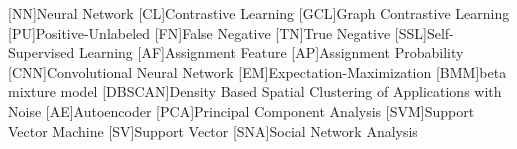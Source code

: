 \begin{acronym}

    [NN]{Neural Network}
    [CL]{Contrastive Learning}
    [GCL]{Graph Contrastive Learning}
    [PU]{Positive-Unlabeled}
    [FN]{False Negative}
    [TN]{True Negative}
    [SSL]{Self-Supervised Learning}
    [AF]{Assignment Feature}
    [AP]{Assignment Probability}
    [CNN]{Convolutional Neural Network}
    [EM]{Expectation-Maximization}
    [BMM]{beta mixture model}
    [DBSCAN]{Density Based Spatial Clustering of Applications with Noise}
    [AE]{Autoencoder}
    [PCA]{Principal Component Analysis}
    [SVM]{Support Vector Machine}
    [SV]{Support Vector}
    [SNA]{Social Network Analysis}

\end{acronym}